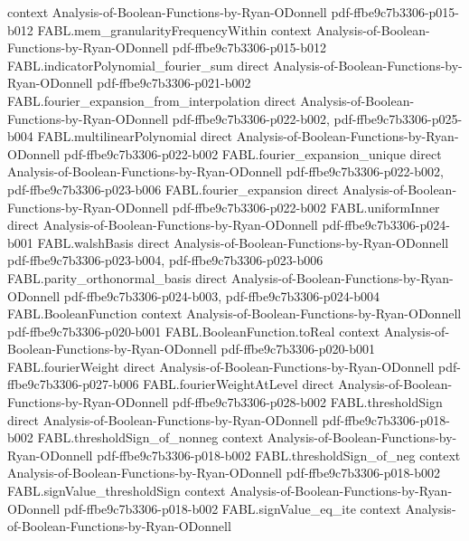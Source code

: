 \begin{theorem}
  {context}
  {Analysis-of-Boolean-Functions-by-Ryan-ODonnell}
  {pdf-ffbe9c7b3306-p015-b012}
\proofstep
  {FABL.mem_granularityFrequencyWithin}
  {context}
  {Analysis-of-Boolean-Functions-by-Ryan-ODonnell}
  {pdf-ffbe9c7b3306-p015-b012}
\proofstep
  {FABL.indicatorPolynomial_fourier_sum}
  {direct}
  {Analysis-of-Boolean-Functions-by-Ryan-ODonnell}
  {pdf-ffbe9c7b3306-p021-b002}
\proofstep
  {FABL.fourier_expansion_from_interpolation}
  {direct}
  {Analysis-of-Boolean-Functions-by-Ryan-ODonnell}
  {pdf-ffbe9c7b3306-p022-b002,
    pdf-ffbe9c7b3306-p025-b004}
\proofstep
  {FABL.multilinearPolynomial}
  {direct}
  {Analysis-of-Boolean-Functions-by-Ryan-ODonnell}
  {pdf-ffbe9c7b3306-p022-b002}
\proofstep
  {FABL.fourier_expansion_unique}
  {direct}
  {Analysis-of-Boolean-Functions-by-Ryan-ODonnell}
  {pdf-ffbe9c7b3306-p022-b002,
    pdf-ffbe9c7b3306-p023-b006}
\proofstep
  {FABL.fourier_expansion}
  {direct}
  {Analysis-of-Boolean-Functions-by-Ryan-ODonnell}
  {pdf-ffbe9c7b3306-p022-b002}
\proofstep
  {FABL.uniformInner}
  {direct}
  {Analysis-of-Boolean-Functions-by-Ryan-ODonnell}
  {pdf-ffbe9c7b3306-p024-b001}
\proofstep
  {FABL.walshBasis}
  {direct}
  {Analysis-of-Boolean-Functions-by-Ryan-ODonnell}
  {pdf-ffbe9c7b3306-p023-b004,
    pdf-ffbe9c7b3306-p023-b006}
\proofstep
  {FABL.parity_orthonormal_basis}
  {direct}
  {Analysis-of-Boolean-Functions-by-Ryan-ODonnell}
  {pdf-ffbe9c7b3306-p024-b003,
    pdf-ffbe9c7b3306-p024-b004}
\proofstep
  {FABL.BooleanFunction}
  {context}
  {Analysis-of-Boolean-Functions-by-Ryan-ODonnell}
  {pdf-ffbe9c7b3306-p020-b001}
\proofstep
  {FABL.BooleanFunction.toReal}
  {context}
  {Analysis-of-Boolean-Functions-by-Ryan-ODonnell}
  {pdf-ffbe9c7b3306-p020-b001}
\proofstep
  {FABL.fourierWeight}
  {direct}
  {Analysis-of-Boolean-Functions-by-Ryan-ODonnell}
  {pdf-ffbe9c7b3306-p027-b006}
\proofstep
  {FABL.fourierWeightAtLevel}
  {direct}
  {Analysis-of-Boolean-Functions-by-Ryan-ODonnell}
  {pdf-ffbe9c7b3306-p028-b002}
\proofstep
  {FABL.thresholdSign}
  {direct}
  {Analysis-of-Boolean-Functions-by-Ryan-ODonnell}
  {pdf-ffbe9c7b3306-p018-b002}
\proofstep
  {FABL.thresholdSign_of_nonneg}
  {context}
  {Analysis-of-Boolean-Functions-by-Ryan-ODonnell}
  {pdf-ffbe9c7b3306-p018-b002}
\proofstep
  {FABL.thresholdSign_of_neg}
  {context}
  {Analysis-of-Boolean-Functions-by-Ryan-ODonnell}
  {pdf-ffbe9c7b3306-p018-b002}
\proofstep
  {FABL.signValue_thresholdSign}
  {context}
  {Analysis-of-Boolean-Functions-by-Ryan-ODonnell}
  {pdf-ffbe9c7b3306-p018-b002}
\proofstep
  {FABL.signValue_eq_ite}
  {context}
  {Analysis-of-Boolean-Functions-by-Ryan-ODonnell}

\end{theorem}
